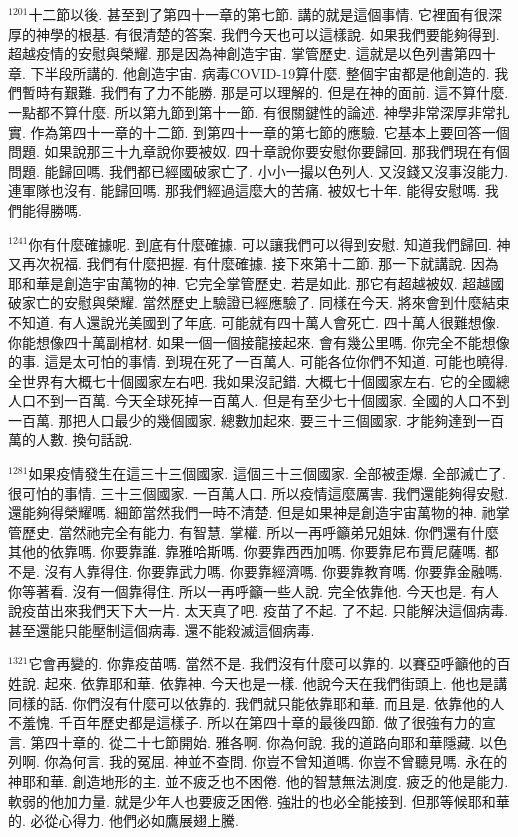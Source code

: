 \documentclass{book}
\begin{document}
$^{1201}$十二節以後.
甚至到了第四十一章的第七節.
講的就是這個事情.
它裡面有很深厚的神學的根基.
有很清楚的答案.
我們今天也可以這樣說.
如果我們要能夠得到.
超越疫情的安慰與榮耀.
那是因為神創造宇宙.
掌管歷史.
這就是以色列書第四十章.
下半段所講的.
他創造宇宙.
病毒COVID-19算什麼.
整個宇宙都是他創造的.
我們暫時有艱難.
我們有了力不能勝.
那是可以理解的.
但是在神的面前.
這不算什麼.
一點都不算什麼.
所以第九節到第十一節.
有很關鍵性的論述.
神學非常深厚非常扎實.
作為第四十一章的十二節.
到第四十一章的第七節的應驗.
它基本上要回答一個問題.
如果說那三十九章說你要被奴.
四十章說你要安慰你要歸回.
那我們現在有個問題.
能歸回嗎.
我們都已經國破家亡了.
小小一撮以色列人.
又沒錢又沒事沒能力.
連軍隊也沒有.
能歸回嗎.
那我們經過這麼大的苦痛.
被奴七十年.
能得安慰嗎.
我們能得勝嗎.

$^{1241}$你有什麼確據呢.
到底有什麼確據.
可以讓我們可以得到安慰.
知道我們歸回.
神又再次祝福.
我們有什麼把握.
有什麼確據.
接下來第十二節.
那一下就講說.
因為耶和華是創造宇宙萬物的神.
它完全掌管歷史.
若是如此.
那它有超越被奴.
超越國破家亡的安慰與榮耀.
當然歷史上驗證已經應驗了.
同樣在今天.
將來會到什麼結束不知道.
有人還說光美國到了年底.
可能就有四十萬人會死亡.
四十萬人很難想像.
你能想像四十萬副棺材.
如果一個一個接龍接起來.
會有幾公里嗎.
你完全不能想像的事.
這是太可怕的事情.
到現在死了一百萬人.
可能各位你們不知道.
可能也曉得.
全世界有大概七十個國家左右吧.
我如果沒記錯.
大概七十個國家左右.
它的全國總人口不到一百萬.
今天全球死掉一百萬人.
但是有至少七十個國家.
全國的人口不到一百萬.
那把人口最少的幾個國家.
總數加起來.
要三十三個國家.
才能夠達到一百萬的人數.
換句話說.

$^{1281}$如果疫情發生在這三十三個國家.
這個三十三個國家.
全部被歪爆.
全部滅亡了.
很可怕的事情.
三十三個國家.
一百萬人口.
所以疫情這麼厲害.
我們還能夠得安慰.
還能夠得榮耀嗎.
細節當然我們一時不清楚.
但是如果神是創造宇宙萬物的神.
祂掌管歷史.
當然祂完全有能力.
有智慧.
掌權.
所以一再呼籲弟兄姐妹.
你們還有什麼其他的依靠嗎.
你要靠誰.
靠雅哈斯嗎.
你要靠西西加嗎.
你要靠尼布賈尼薩嗎.
都不是.
沒有人靠得住.
你要靠武力嗎.
你要靠經濟嗎.
你要靠教育嗎.
你要靠金融嗎.
你等著看.
沒有一個靠得住.
所以一再呼籲一些人說.
完全依靠他.
今天也是.
有人說疫苗出來我們天下大一片.
太天真了吧.
疫苗了不起.
了不起.
只能解決這個病毒.
甚至還能只能壓制這個病毒.
還不能殺滅這個病毒.

$^{1321}$它會再變的.
你靠疫苗嗎.
當然不是.
我們沒有什麼可以靠的.
以賽亞呼籲他的百姓說.
起來.
依靠耶和華.
依靠神.
今天也是一樣.
他說今天在我們街頭上.
他也是講同樣的話.
你們沒有什麼可以依靠的.
我們就只能依靠耶和華.
而且是.
依靠他的人不羞愧.
千百年歷史都是這樣子.
所以在第四十章的最後四節.
做了很強有力的宣言.
第四十章的.
從二十七節開始.
雅各啊.
你為何說.
我的道路向耶和華隱藏.
以色列啊.
你為何言.
我的冤屈.
神並不查問.
你豈不曾知道嗎.
你豈不曾聽見嗎.
永在的神耶和華.
創造地形的主.
並不疲乏也不困倦.
他的智慧無法測度.
疲乏的他是能力.
軟弱的他加力量.
就是少年人也要疲乏困倦.
強壯的也必全能接到.
但那等候耶和華的.
必從心得力.
他們必如鷹展翅上騰.
\end{document}
